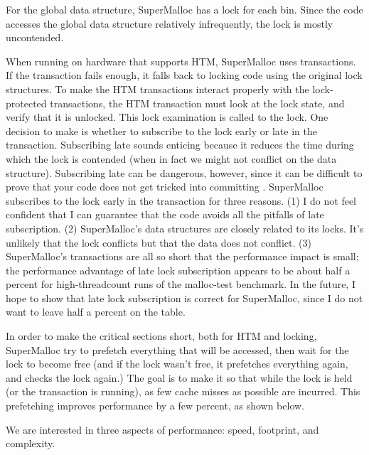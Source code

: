 \documentclass[natbib,sort&compress]{sigplanconf}
\begin{document}
For the global data structure, SuperMalloc has a lock for each bin.
Since the code accesses the global data structure relatively
infrequently, the lock is mostly uncontended.

When running on hardware that supports HTM, SuperMalloc uses transactions.  If
the transaction fails enough, it falls back to locking code using the
original lock structures.  To make the HTM transactions interact
properly with the lock-protected transactions, the HTM transaction
must look at the lock state, and verify that it is unlocked.  This
lock examination is called  to the lock.  One
decision to make is whether to subscribe to the lock early or late in
the transaction.  Subscribing late sounds enticing because it reduces
the time during which the lock is contended (when in fact we might
not conflict on the data structure).  Subscribing late can be
dangerous, however, since it can be difficult to prove that your code
does not get tricked into committing \cite{DiceHaKo14}.  SuperMalloc
subscribes to the lock early in the transaction for three reasons.
(1) I do not feel confident that I can guarantee that the code avoids
all the pitfalls of late subscription.  (2) SuperMalloc's data
structures are closely related to its locks.  It's unlikely that the
lock conflicts but that the data does not conflict.  (3) SuperMalloc's
transactions are all so short that the performance impact is small;
the performance advantage of late lock subscription appears to be
about half a percent for high-threadcount runs of the malloc-test
benchmark.  In the future, I hope to show that late lock subscription
is correct for SuperMalloc, since I do not want to leave half a
percent on the table.

In order to make the critical sections short, both for HTM and
locking, SuperMalloc try to prefetch everything that will be accessed,
then wait for the lock to become free (and if the lock wasn't free, it
prefetches everything again, and checks the lock again.)  The goal is
to make it so that while the lock is held (or the transaction is
running), as few cache misses as possible are incurred.  This
prefetching improves performance by a few percent, as shown below.


We are interested in three aspects of performance: speed, footprint,
and complexity.
\end{document}

